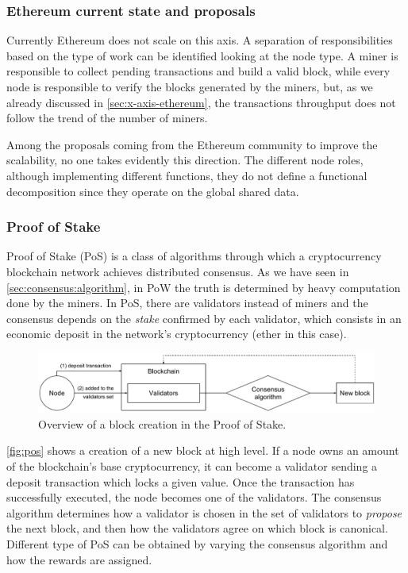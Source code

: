\subsubsection{Ethereum current state and proposals}
Currently Ethereum does not scale on this axis. A separation of responsibilities
based on the type of work can be identified looking at the node type. A miner is
responsible to collect pending transactions and build a valid block, while every
node is responsible to verify the blocks generated by the miners, but, as we
already discussed in \autoref{sec:x-axis-ethereum}, the transactions throughput
does not follow the trend of the number of miners.

Among the proposals coming from the Ethereum community to improve the
scalability, no one takes evidently this direction. The different node roles,
although implementing different functions, they do not define a functional
decomposition since they operate on the global shared data.

\subsubsection{Proof of Stake}
\label{sec:pos}
Proof of Stake (PoS) is a class of algorithms through which a cryptocurrency
blockchain network achieves distributed consensus. As we have seen in
\autoref{sec:consensus:algorithm}, in PoW the truth is determined by heavy
computation done by the miners. In PoS, there are validators instead of miners
and the consensus depends on the \emph{stake} confirmed by each validator, which
consists in an economic deposit in the network's cryptocurrency (ether in this
case).

\begin{figure}
    \begin{center}
        \includegraphics[width=\textwidth]{./res/img/pos.pdf}
    \end{center}
    \caption{Overview of a block creation in the Proof of Stake.}
    \label{fig:pos}
\end{figure}

\autoref{fig:pos} shows a creation of a new block at high level. If a node owns
an amount of the blockchain's base cryptocurrency, it can become a validator
sending a deposit transaction which locks a given value. Once the transaction
has successfully executed, the node becomes one of the validators. The consensus
algorithm determines how a validator is chosen in the set of validators to
\emph{propose} the next block, and then how the validators agree on which block
is canonical. Different type of PoS can be obtained by varying the consensus
algorithm and how the rewards are assigned.

